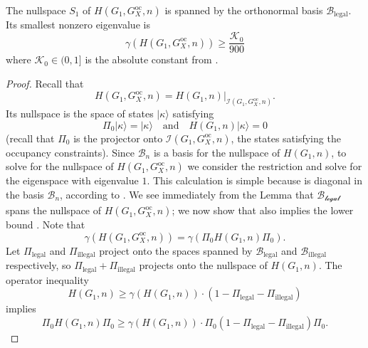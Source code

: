 \documentclass[../thesis-main/thesis-main]{subfiles}
\begin{document}
\begin{lemma}
\label{lem:H_Galpha_Gtilde}The nullspace $S_1$ of $H(G_{1},G_X^{\text{oc}},n)$ is spanned by the orthonormal basis $\mathcal{B}_{\text{legal}}$. Its smallest nonzero eigenvalue is
\begin{equation}
  \gamma(H(G_{1},G_X^{\text{oc}},n)) \geq \frac{\mathcal{K}_0}{900} \label{eq:G_alpha_lowerbnd}
\end{equation}
where $\mathcal{K}_0\in (0,1]$ is the absolute constant from .
\end{lemma}

\begin{proof}
Recall that 
\begin{equation}
H(G_{1},G_X^{\text{oc}},n)=H(G_{1},n)|_{\mathcal{I}(G_{1},G_X^{\text{oc}},n)}.
\end{equation}
Its nullspace is the space of states $|\kappa\rangle$ satisfying
\begin{equation}
\Pi_{0}|\kappa\rangle=|\kappa\rangle\quad\text{and}\quad H(G_{1},n)|\kappa\rangle=0
\end{equation}
(recall that $\Pi_{0}$ is the projector onto $\mathcal{I}(G_{1},G_X^{\text{oc}},n)$, the states satisfying the occupancy constraints). Since $\mathcal{B}_{n}$ is a basis for the nullspace of $H(G_{1},n)$, to solve for the nullspace of $H(G_{1},G_X^{\text{oc}},n)$ we consider the restriction  and solve for the eigenspace with eigenvalue $1$. This calculation is simple because  is diagonal in the basis $\mathcal{B}_{n}$, according to . We see immediately from the Lemma that $\mathcal{\mathcal{B}_{\text{legal}}}$ spans the nullspace of $H(G_{1},G_X^{\text{oc}},n)$; we now show that  also implies the lower bound . Note that
\begin{equation}
\gamma(H(G_{1},G_X^{\text{oc}},n))=\gamma(\Pi_{0}H(G_{1},n)\Pi_{0}).
\end{equation}
Let $\Pi_{\text{legal}}$ and $\Pi_{\text{illegal}}$ project onto the spaces spanned by $\mathcal{B}_{\text{legal}}$ and $\mathcal{B}_{\text{illegal}}$ respectively, so $\Pi_{\text{legal}}+\Pi_{\text{illegal}}$ projects onto the nullspace of $H(G_{1},n)$. The operator inequality
\begin{equation}
H(G_{1},n)\geq\gamma(H(G_{1},n))\cdot\left(1-\Pi_{\text{legal}}-\Pi_{\text{illegal}}\right)
\end{equation}
implies 
\begin{equation}
\Pi_{0}H(G_{1},n)\Pi_{0}\geq\gamma(H(G_{1},n))\cdot\Pi_{0}(1-\Pi_{\text{legal}}-\Pi_{\text{illegal}})\Pi_{0}.

\end{equation}
\end{proof}
\end{document}
